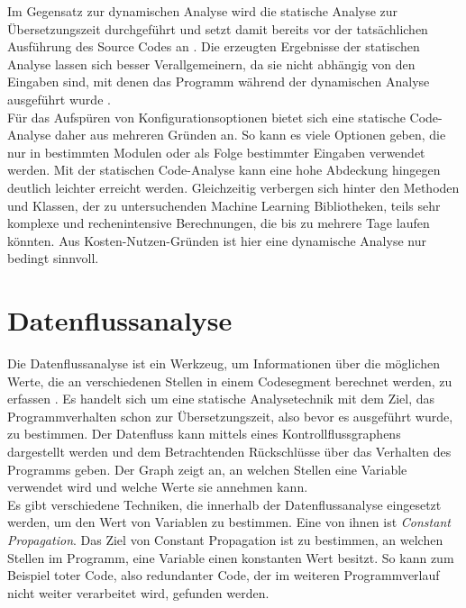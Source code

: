 \documentclass[german,bachelor]{swsLeipzig}
\begin{document}
Im Gegensatz zur dynamischen Analyse wird die statische Analyse zur Übersetzungszeit durchgeführt
und setzt damit bereits vor der tatsächlichen Ausführung des Source Codes an \cite[S. 2]{gomes2009overview}.
Die erzeugten Ergebnisse der statischen Analyse lassen sich besser Verallgemeinern, da sie nicht abhängig von den Eingaben sind,
mit denen das Programm während der dynamischen Analyse ausgeführt wurde \cite[S. 6]{gomes2009overview}.\\

Für das Aufspüren von Konfigurationsoptionen bietet sich eine statische Code-Analyse daher aus mehreren Gründen an.
So kann es viele Optionen geben, die nur in bestimmten Modulen oder als Folge bestimmter Eingaben verwendet werden.
Mit der statischen Code-Analyse kann eine hohe Abdeckung hingegen deutlich leichter erreicht werden.
Gleichzeitig verbergen sich hinter den Methoden und Klassen, der zu untersuchenden Machine Learning Bibliotheken,
teils sehr komplexe und rechenintensive Berechnungen, die bis zu mehrere Tage laufen könnten.
Aus Kosten-Nutzen-Gründen ist hier eine dynamische Analyse nur bedingt sinnvoll.\\

\section{Datenflussanalyse}
Die Datenflussanalyse ist ein Werkzeug, um Informationen über die möglichen Werte, die an verschiedenen
Stellen in einem Codesegment berechnet werden, zu erfassen \cite[S. 1537]{58766}.
Es handelt sich um eine statische Analysetechnik mit dem Ziel, das Programmverhalten schon zur Übersetzungszeit,
also bevor es ausgeführt wurde, zu bestimmen.
Der Datenfluss kann mittels eines Kontrollflussgraphens dargestellt werden und dem Betrachtenden
Rückschlüsse über das Verhalten des Programms geben.
Der Graph zeigt an, an welchen Stellen eine Variable verwendet wird und welche Werte sie annehmen kann.\\

Es gibt verschiedene Techniken, die innerhalb der Datenflussanalyse eingesetzt werden, um den Wert von Variablen zu bestimmen.
Eine von ihnen ist \textit{Constant Propagation}.
Das Ziel von Constant Propagation ist zu bestimmen, an welchen Stellen im Programm, eine Variable einen konstanten Wert besitzt.
So kann zum Beispiel toter Code, also redundanter Code, der im weiteren Programmverlauf nicht weiter verarbeitet wird, gefunden werden.\\
\end{document}
